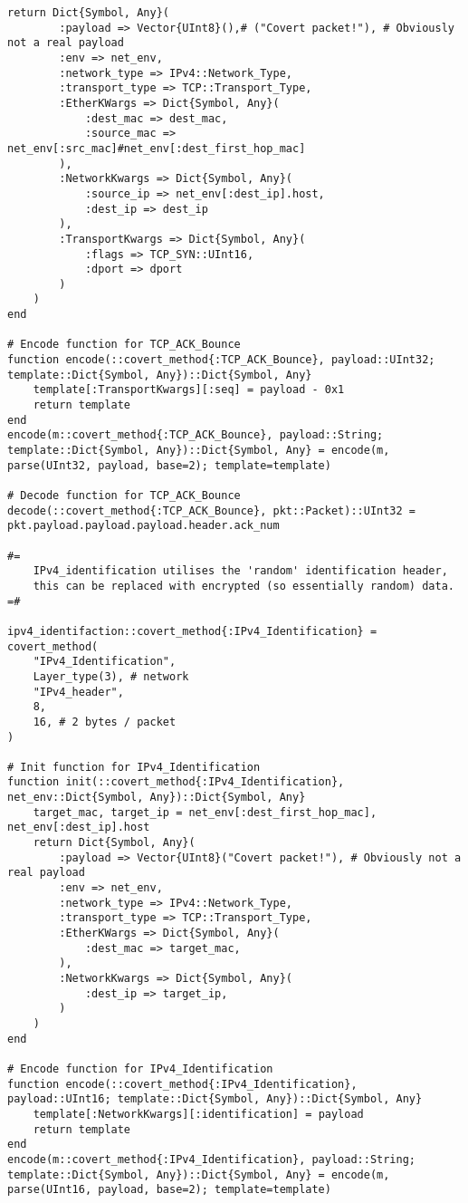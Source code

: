 \begin{lstlisting}[language=JuliaLocal, style=julia]
    return Dict{Symbol, Any}(
        :payload => Vector{UInt8}(),# ("Covert packet!"), # Obviously not a real payload
        :env => net_env,
        :network_type => IPv4::Network_Type,
        :transport_type => TCP::Transport_Type,
        :EtherKWargs => Dict{Symbol, Any}(
            :dest_mac => dest_mac,
            :source_mac => net_env[:src_mac]#net_env[:dest_first_hop_mac]
        ),
        :NetworkKwargs => Dict{Symbol, Any}(
            :source_ip => net_env[:dest_ip].host,
            :dest_ip => dest_ip
        ),
        :TransportKwargs => Dict{Symbol, Any}(
            :flags => TCP_SYN::UInt16,
            :dport => dport
        )
    )
end

# Encode function for TCP_ACK_Bounce
function encode(::covert_method{:TCP_ACK_Bounce}, payload::UInt32; template::Dict{Symbol, Any})::Dict{Symbol, Any} 
    template[:TransportKwargs][:seq] = payload - 0x1
    return template
end
encode(m::covert_method{:TCP_ACK_Bounce}, payload::String; template::Dict{Symbol, Any})::Dict{Symbol, Any} = encode(m, parse(UInt32, payload, base=2); template=template)

# Decode function for TCP_ACK_Bounce
decode(::covert_method{:TCP_ACK_Bounce}, pkt::Packet)::UInt32 = pkt.payload.payload.payload.header.ack_num

#=
    IPv4_identification utilises the 'random' identification header,
    this can be replaced with encrypted (so essentially random) data.
=#

ipv4_identifaction::covert_method{:IPv4_Identification} = covert_method(
    "IPv4_Identification",
    Layer_type(3), # network
    "IPv4_header",
    8,
    16, # 2 bytes / packet
)

# Init function for IPv4_Identification
function init(::covert_method{:IPv4_Identification}, net_env::Dict{Symbol, Any})::Dict{Symbol, Any}
    target_mac, target_ip = net_env[:dest_first_hop_mac], net_env[:dest_ip].host
    return Dict{Symbol, Any}(
        :payload => Vector{UInt8}("Covert packet!"), # Obviously not a real payload
        :env => net_env,
        :network_type => IPv4::Network_Type,
        :transport_type => TCP::Transport_Type,
        :EtherKWargs => Dict{Symbol, Any}(
            :dest_mac => target_mac,
        ),
        :NetworkKwargs => Dict{Symbol, Any}(
            :dest_ip => target_ip,
        )
    )
end

# Encode function for IPv4_Identification
function encode(::covert_method{:IPv4_Identification}, payload::UInt16; template::Dict{Symbol, Any})::Dict{Symbol, Any}
    template[:NetworkKwargs][:identification] = payload
    return template
end
encode(m::covert_method{:IPv4_Identification}, payload::String; template::Dict{Symbol, Any})::Dict{Symbol, Any} = encode(m, parse(UInt16, payload, base=2); template=template)


\end{lstlisting}
